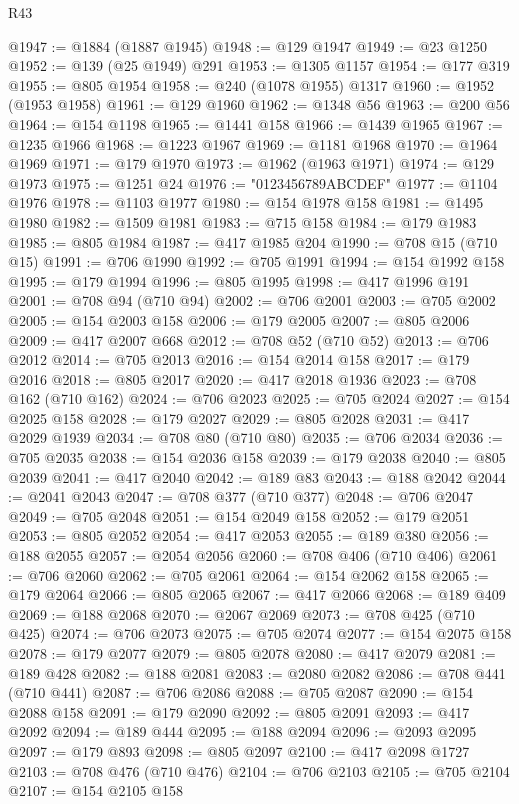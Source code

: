 \begin{lexlean}{R43}
\begin{coremodule}
@1947 := @1884 (@1887 @1945)
@1948 := @129 @1947
@1949 := @23 @1250
@1952 := @139 (@25 @1949) @291
@1953 := @1305 @1157
@1954 := @177 @319
@1955 := @805 @1954
@1958 := @240 (@1078 @1955) @1317
@1960 := @1952 (@1953 @1958)
@1961 := @129 @1960
@1962 := @1348 @56
@1963 := @200 @56
@1964 := @154 @1198
@1965 := @1441 @158
@1966 := @1439 @1965
@1967 := @1235 @1966
@1968 := @1223 @1967
@1969 := @1181 @1968
@1970 := @1964 @1969
@1971 := @179 @1970
@1973 := @1962 (@1963 @1971)
@1974 := @129 @1973
@1975 := @1251 @24
@1976 := "0123456789ABCDEF"
@1977 := @1104 @1976
@1978 := @1103 @1977
@1980 := @154 @1978 @158
@1981 := @1495 @1980
@1982 := @1509 @1981
@1983 := @715 @158
@1984 := @179 @1983
@1985 := @805 @1984
@1987 := @417 @1985 @204
@1990 := @708 @15 (@710 @15)
@1991 := @706 @1990
@1992 := @705 @1991
@1994 := @154 @1992 @158
@1995 := @179 @1994
@1996 := @805 @1995
@1998 := @417 @1996 @191
@2001 := @708 @94 (@710 @94)
@2002 := @706 @2001
@2003 := @705 @2002
@2005 := @154 @2003 @158
@2006 := @179 @2005
@2007 := @805 @2006
@2009 := @417 @2007 @668
@2012 := @708 @52 (@710 @52)
@2013 := @706 @2012
@2014 := @705 @2013
@2016 := @154 @2014 @158
@2017 := @179 @2016
@2018 := @805 @2017
@2020 := @417 @2018 @1936
@2023 := @708 @162 (@710 @162)
@2024 := @706 @2023
@2025 := @705 @2024
@2027 := @154 @2025 @158
@2028 := @179 @2027
@2029 := @805 @2028
@2031 := @417 @2029 @1939
@2034 := @708 @80 (@710 @80)
@2035 := @706 @2034
@2036 := @705 @2035
@2038 := @154 @2036 @158
@2039 := @179 @2038
@2040 := @805 @2039
@2041 := @417 @2040
@2042 := @189 @83
@2043 := @188 @2042
@2044 := @2041 @2043
@2047 := @708 @377 (@710 @377)
@2048 := @706 @2047
@2049 := @705 @2048
@2051 := @154 @2049 @158
@2052 := @179 @2051
@2053 := @805 @2052
@2054 := @417 @2053
@2055 := @189 @380
@2056 := @188 @2055
@2057 := @2054 @2056
@2060 := @708 @406 (@710 @406)
@2061 := @706 @2060
@2062 := @705 @2061
@2064 := @154 @2062 @158
@2065 := @179 @2064
@2066 := @805 @2065
@2067 := @417 @2066
@2068 := @189 @409
@2069 := @188 @2068
@2070 := @2067 @2069
@2073 := @708 @425 (@710 @425)
@2074 := @706 @2073
@2075 := @705 @2074
@2077 := @154 @2075 @158
@2078 := @179 @2077
@2079 := @805 @2078
@2080 := @417 @2079
@2081 := @189 @428
@2082 := @188 @2081
@2083 := @2080 @2082
@2086 := @708 @441 (@710 @441)
@2087 := @706 @2086
@2088 := @705 @2087
@2090 := @154 @2088 @158
@2091 := @179 @2090
@2092 := @805 @2091
@2093 := @417 @2092
@2094 := @189 @444
@2095 := @188 @2094
@2096 := @2093 @2095
@2097 := @179 @893
@2098 := @805 @2097
@2100 := @417 @2098 @1727
@2103 := @708 @476 (@710 @476)
@2104 := @706 @2103
@2105 := @705 @2104
@2107 := @154 @2105 @158

\end{coremodule}
\end{lexlean}
